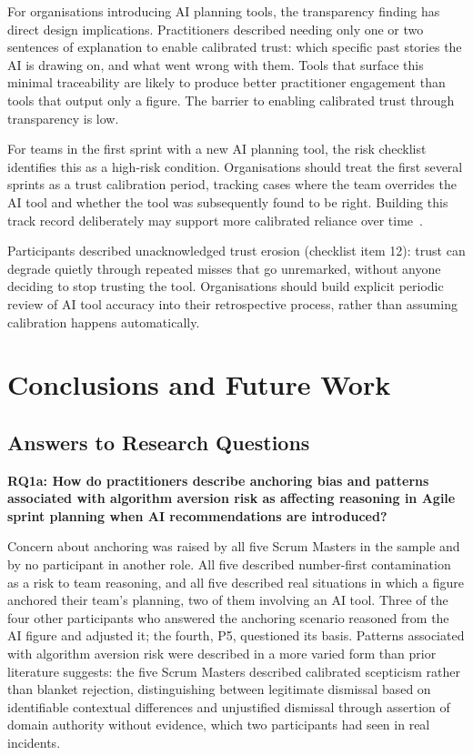 \documentclass[a4paper,twoside]{bth}
\begin{document}
For organisations introducing AI planning tools, the transparency finding has direct design implications. Practitioners described needing only one or two sentences of explanation to enable calibrated trust: which specific past stories the AI is drawing on, and what went wrong with them. Tools that surface this minimal traceability are likely to produce better practitioner engagement than tools that output only a figure. The barrier to enabling calibrated trust through transparency is low.

For teams in the first sprint with a new AI planning tool, the risk checklist identifies this as a high-risk condition. Organisations should treat the first several sprints as a trust calibration period, tracking cases where the team overrides the AI tool and whether the tool was subsequently found to be right. Building this track record deliberately may support more calibrated reliance over time~\cite{lee2004trust}.

Participants described unacknowledged trust erosion (checklist item 12): trust can degrade quietly through repeated misses that go unremarked, without anyone deciding to stop trusting the tool. Organisations should build explicit periodic review of AI tool accuracy into their retrospective process, rather than assuming calibration happens automatically.


\chapter{Conclusions and Future Work}
\label{chp:conclusions}

\section{Answers to Research Questions}

\textbf{RQ1a: How do practitioners describe anchoring bias and patterns associated with algorithm aversion risk as affecting reasoning in Agile sprint planning when AI recommendations are introduced?}

Concern about anchoring was raised by all five Scrum Masters in the sample and by no participant in another role. All five described number-first contamination as a risk to team reasoning, and all five described real situations in which a figure anchored their team's planning, two of them involving an AI tool. Three of the four other participants who answered the anchoring scenario reasoned from the AI figure and adjusted it; the fourth, P5, questioned its basis. Patterns associated with algorithm aversion risk were described in a more varied form than prior literature suggests: the five Scrum Masters described calibrated scepticism rather than blanket rejection, distinguishing between legitimate dismissal based on identifiable contextual differences and unjustified dismissal through assertion of domain authority without evidence, which two participants had seen in real incidents.
\end{document}
